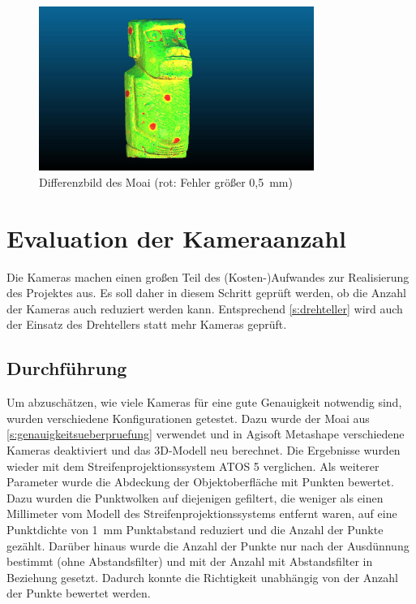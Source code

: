 \documentclass[./00PhotoBox.tex]{subfiles}
\begin{document}
\begin{figure}
    \centering
    \includegraphics[width=0.8\textwidth]{img/moai_fehler_drehteller.jpg}
    \caption{Differenzbild des Moai (rot: Fehler größer 0,5~mm)}
    \label{img:drehteller_moai_fehler}
\end{figure}



\section{Evaluation der Kameraanzahl}
\label{s:kameraanzahl}
Die Kameras machen einen großen Teil des (Kosten-)Aufwandes zur Realisierung des Projektes aus. Es soll daher in diesem Schritt geprüft werden, ob die Anzahl der Kameras auch reduziert werden kann. Entsprechend \autoref{s:drehteller} wird auch der Einsatz des Drehtellers statt mehr Kameras geprüft.

\subsection{Durchführung}
Um abzuschätzen, wie viele Kameras für eine gute Genauigkeit notwendig sind, wurden verschiedene Konfigurationen getestet. Dazu wurde der Moai aus \autoref{s:genauigkeitsueberpruefung} verwendet und in Agisoft Metashape verschiedene Kameras deaktiviert und das 3D-Modell neu berechnet. Die Ergebnisse wurden wieder mit dem Streifenprojektionssystem ATOS 5 verglichen. Als weiterer Parameter wurde die Abdeckung der Objektoberfläche mit Punkten bewertet. Dazu wurden die Punktwolken auf diejenigen gefiltert, die weniger als einen Millimeter vom Modell des Streifenprojektionssystems entfernt waren, auf eine Punktdichte von 1~mm Punktabstand reduziert und die Anzahl der Punkte gezählt. Darüber hinaus wurde die Anzahl der Punkte nur nach der Ausdünnung bestimmt (ohne Abstandsfilter) und mit der Anzahl mit Abstandsfilter in Beziehung gesetzt. Dadurch konnte  die Richtigkeit unabhängig von der Anzahl der Punkte bewertet werden.
\end{document}
